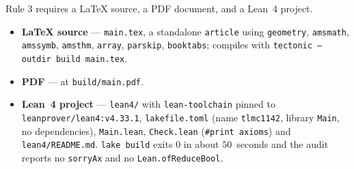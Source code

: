 \documentclass[11pt]{article}
\theoremstyle{definition}
\theoremstyle{remark}
\begin{document}
Rule 3 requires a LaTeX source, a PDF document, and a Lean~4 project.

\begin{itemize}
\item \textbf{LaTeX source} --- \texttt{main.tex}, a standalone \texttt{article}
  using \texttt{geometry}, \texttt{amsmath}, \texttt{amssymb}, \texttt{amsthm},
  \texttt{array}, \texttt{parskip}, \texttt{booktabs}; compiles with
  \texttt{tectonic --outdir build main.tex}.
\item \textbf{PDF} --- at \texttt{build/main.pdf}.
\item \textbf{Lean~4 project} --- \texttt{lean4/} with \texttt{lean-toolchain}
  pinned to \texttt{leanprover/lean4:v4.33.1}, \texttt{lakefile.toml}
  (name \texttt{tlmc1142}, library \texttt{Main}, no dependencies),
  \texttt{Main.lean}, \texttt{Check.lean} (\texttt{\#print axioms}) and
  \texttt{lean4/README.md}. \texttt{lake build} exits $0$ in about $50$~seconds
  and the audit reports no \texttt{sorryAx} and no \texttt{Lean.ofReduceBool}.
\end{itemize}
\end{document}
